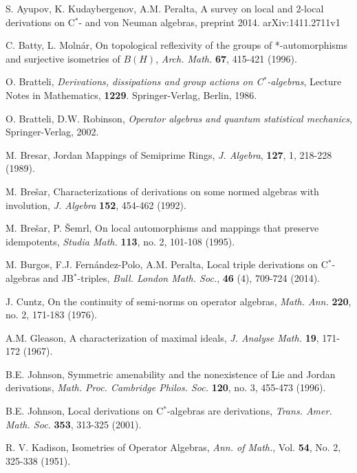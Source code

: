 \documentclass[11pt]{amsart}
\begin{document}
\begin{thebibliography}{22}

 S. Ayupov, K. Kudaybergenov, A.M. Peralta, A survey on local and 2-local derivations on C$^*$- and von Neuman algebras, preprint 2014. arXiv:1411.2711v1

 C. Batty, L. Moln\'{a}r, On topological reflexivity of the groups of *-automorphisms and surjective isometries of $B(H)$, \emph{Arch. Math.} \textbf{67}, 415-421 (1996).

 O. Bratteli, \emph{Derivations, dissipations and group actions on C$^*$-algebras}, Lecture Notes in Mathematics, \textbf{1229}. Springer-Verlag, Berlin, 1986.

 O. Bratteli, D.W. Robinson, \emph{Operator algebras and quantum statistical mechanics}, Springer-Verlag, 2002.

 M. Bresar, Jordan Mappings of Semiprime Rings, \emph{J. Algebra}, \textbf{127}, 1, 218-228 (1989).

 M. Bre\v{s}ar, Characterizations of derivations on some normed algebras with involution, \emph{J. Algebra} \textbf{152}, 454-462 (1992).

 M. Bre\v{s}ar, P. \v{S}emrl, On local automorphisms and mappings that preserve idempotents, \emph{Studia Math.} \textbf{113}, no. 2, 101-108  (1995).

 M. Burgos, F.J. Fern{\' a}ndez-Polo, A.M. Peralta, Local triple derivations on C$^*$-algebras and JB$^*$-triples, \emph{Bull. London Math. Soc.}, \textbf{46} (4), 709-724 (2014).

 J. Cuntz, On the continuity of semi-norms on operator algebras, \emph{Math. Ann.}
\textbf{220}, no. 2, 171-183 (1976).

 A.M. Gleason, A characterization of maximal ideals, \emph{J. Analyse Math.} \textbf{19}, 171-172 (1967).

 B.E. Johnson, Symmetric amenability and the nonexistence of Lie and
Jordan derivations, \emph{Math. Proc. Cambridge Philos. Soc.}
\textbf{120}, no. 3, 455-473 (1996).

 B.E. Johnson, Local derivations on C$^*$-algebras are derivations,
\emph{Trans. Amer. Math. Soc.} \textbf{353}, 313-325 (2001).

 R. V. Kadison, Isometries of Operator Algebras, \emph{Ann. of Math.}, Vol. \textbf{54}, No. 2, 325-338  (1951).


\end{thebibliography}
\end{document}
